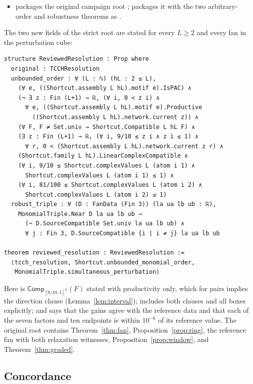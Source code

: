 \documentclass[11pt,a4paper]{article}
\theoremstyle{plain}
\theoremstyle{definition}
\theoremstyle{remark}
\newcommand{\Comp}{\mathsf{Comp}}
\begin{document}
\begin{itemize}[before=\sloppy]
\item {} packages the original campaign root ;  packages it with the two arbitrary-order and robustness theorems as .
\end{itemize}

The two new fields of the strict root are stated for every $L\ge2$ and every fan in the perturbation cube:
\begin{lstlisting}
structure ReviewedResolution : Prop where
  original : TCCHResolution
  unbounded_order : ∀ (L : ℕ) (hL : 2 ≤ L),
    (∀ e, ((Shortcut.assembly L hL).motif e).IsPAC) ∧
    (¬ ∃ z : Fin (L+1) → ℝ, (∀ i, 0 < z i) ∧
      ∀ e, ((Shortcut.assembly L hL).motif e).Productive
        ((Shortcut.assembly L hL).network.current z)) ∧
    (∀ F, F ≠ Set.univ → Shortcut.Compatible L hL F) ∧
    (∃ z : Fin (L+1) → ℝ, (∀ i, 9/10 ≤ z i ∧ z i ≤ 1) ∧
      ∀ r, 0 < (Shortcut.assembly L hL).network.current z r) ∧
    (Shortcut.family L hL).LinearComplexCompatible ∧
    (∀ i, 9/10 ≤ Shortcut.complexValues L (atom i 1) ∧
      Shortcut.complexValues L (atom i 1) ≤ 1) ∧
    (∀ i, 81/100 ≤ Shortcut.complexValues L (atom i 2) ∧
      Shortcut.complexValues L (atom i 2) ≤ 1)
  robust_triple : ∀ (D : FanData (Fin 3)) (la ua lb ub : ℝ),
    MonomialTriple.Near D la ua lb ub →
      (¬ D.SourceCompatible Set.univ la ua lb ub) ∧
      ∀ j : Fin 3, D.SourceCompatible {i | i ≠ j} la ua lb ub

theorem reviewed_resolution : ReviewedResolution :=
  ⟨tcch_resolution, Shortcut.unbounded_monomial_order,
   MonomialTriple.simultaneous_perturbation⟩
\end{lstlisting}
Here  is $\Comp_{[9/10,1]^n}(F)$ stated with productivity only, which for pairs implies the direction clause (Lemma~\ref{lem:interval});  includes both clauses and all boxes explicitly; and  says that the gains agree with the reference data and that each of the seven factors and ten endpoints is within $10^{-6}$ of its reference value. The original root  contains Theorem~\ref{thm:fan}, Proposition~\ref{prop:ring}, the reference fan with both relaxation witnesses, Proposition~\ref{prop:window}, and Theorem~\ref{thm:graded}.

\subsection{Concordance}
\end{document}
